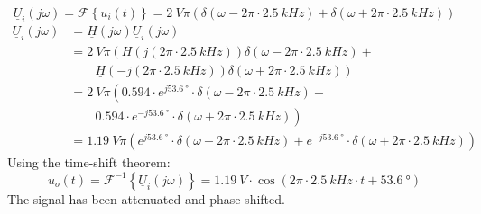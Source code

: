 \begin{solution}
\begin{tasks}
		\task
		\begin{equation*}
			\underline{U}_i\left(j \omega\right) = \mathcal{F}\left\{u_i(t)\right\} = \SI{2}{V} \pi \left(\delta\left(\omega - 2 \pi \cdot \SI{2.5}{kHz}\right) + \delta\left(\omega + 2 \pi \cdot \SI{2.5}{kHz}\right)\right)
		\end{equation*}
		\begin{equation*}
			\begin{split}
				\underline{U}_i\left(j \omega\right) &= \underline{H}\left(j \omega\right) \underline{U}_i\left(j \omega\right) \\
				 &= \SI{2}{V} \pi \left(\underline{H}\left(j \left(2 \pi \cdot \SI{2.5}{kHz}\right)\right) \delta\left(\omega - 2 \pi \cdot \SI{2.5}{kHz}\right) \right. + \\ &\qquad \left. \underline{H}\left(-j \left(2 \pi \cdot \SI{2.5}{kHz}\right)\right) \delta\left(\omega + 2 \pi \cdot \SI{2.5}{kHz}\right)\right) \\
				 &= \SI{2}{V} \pi \left(0.594 \cdot e^{j \SI{53.6}{\degree}} \cdot \delta\left(\omega - 2 \pi \cdot \SI{2.5}{kHz}\right) \right. + \\ &\qquad \left. 0.594 \cdot e^{-j \SI{53.6}{\degree}} \cdot \delta\left(\omega + 2 \pi \cdot \SI{2.5}{kHz}\right)\right) \\
				 &= \SI{1.19}{V} \pi \left(e^{j \SI{53.6}{\degree}} \cdot \delta\left(\omega - 2 \pi \cdot \SI{2.5}{kHz}\right) + e^{-j \SI{53.6}{\degree}} \cdot \delta\left(\omega + 2 \pi \cdot \SI{2.5}{kHz}\right)\right)
			\end{split}
		\end{equation*}
		Using the time-shift theorem:
		\begin{equation*}
			u_o(t) = \mathcal{F}^{-1}\left\{\underline{U}_i\left(j \omega\right)\right\} = \SI{1.19}{V} \cdot \cos\left(2 \pi \cdot \SI{2.5}{kHz} \cdot t + \SI{53.6}{\degree}\right)
		\end{equation*}
		The signal has been attenuated and phase-shifted.
	\end{tasks}
\end{solution}
